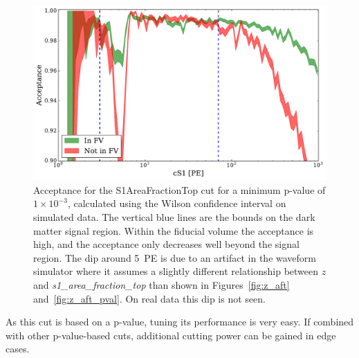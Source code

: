 \begin{figure}[htb]
\centering
    \includegraphics[width=\textwidth]{figures/s1aft/s1aftacceptance}
    \caption{Acceptance for the S1AreaFractionTop cut for a minimum p-value of $1\times10^{-3}$, calculated using the Wilson confidence interval on simulated data. The vertical blue lines are the bounds on the dark matter signal region. Within the fiducial volume the acceptance is high, and the acceptance only decreases well beyond the signal region. The dip around 5~PE is due to an artifact in the waveform simulator where it assumes a slightly different relationship between $z$ and \textit{s1\_area\_fraction\_top} than shown in Figures~\ref{fig:z_aft} and~\ref{fig:z_aft_pval}. On real data this dip is not seen.}\label{fig:accept}
\end{figure}

As this cut is based on a p-value, tuning its performance is very easy. If combined with other p-value-based cuts, additional cutting power can be gained in edge cases.